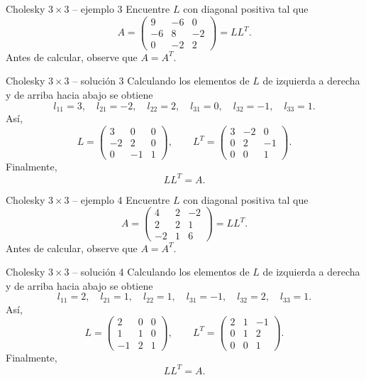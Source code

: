 \documentclass[aspectratio=169,10pt]{beamer}
\begin{document}
\begin{frame}{Cholesky $3\times 3$ -- ejemplo 3}
\small
Encuentre $L$ con diagonal positiva tal que
\[
A=\begin{pmatrix}9 & -6 & 0\\-6 & 8 & -2\\0 & -2 & 2\end{pmatrix}=LL^T.
\]
Antes de calcular, observe que $A=A^T$.
\end{frame}
\begin{frame}{Cholesky $3\times 3$ -- solución 3}
\small
Calculando los elementos de $L$ de izquierda a derecha y de arriba hacia abajo se obtiene
\[
l_{11}=3,\quad l_{21}=-2,\quad l_{22}=2,\quad l_{31}=0,\quad l_{32}=-1,\quad l_{33}=1.
\]
Así,
\[
L=\begin{pmatrix}3 & 0 & 0\\-2 & 2 & 0\\0 & -1 & 1\end{pmatrix},\qquad L^T=\begin{pmatrix}3 & -2 & 0\\0 & 2 & -1\\0 & 0 & 1\end{pmatrix}.
\]
Finalmente,
\[
\boxed{LL^T=A}.
\]
\end{frame}
\begin{frame}{Cholesky $3\times 3$ -- ejemplo 4}
\small
Encuentre $L$ con diagonal positiva tal que
\[
A=\begin{pmatrix}4 & 2 & -2\\2 & 2 & 1\\-2 & 1 & 6\end{pmatrix}=LL^T.
\]
Antes de calcular, observe que $A=A^T$.
\end{frame}
\begin{frame}{Cholesky $3\times 3$ -- solución 4}
\small
Calculando los elementos de $L$ de izquierda a derecha y de arriba hacia abajo se obtiene
\[
l_{11}=2,\quad l_{21}=1,\quad l_{22}=1,\quad l_{31}=-1,\quad l_{32}=2,\quad l_{33}=1.
\]
Así,
\[
L=\begin{pmatrix}2 & 0 & 0\\1 & 1 & 0\\-1 & 2 & 1\end{pmatrix},\qquad L^T=\begin{pmatrix}2 & 1 & -1\\0 & 1 & 2\\0 & 0 & 1\end{pmatrix}.
\]
Finalmente,
\[
\boxed{LL^T=A}.
\]
\end{frame}
\end{document}
